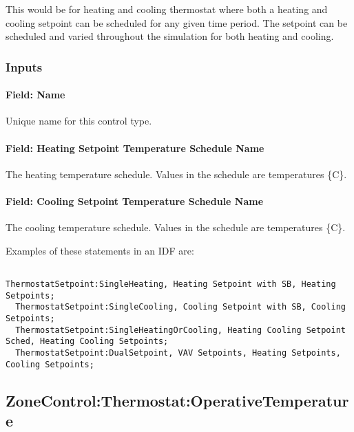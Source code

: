 This would be for heating and cooling thermostat where both a heating and cooling setpoint can be scheduled for any given time period. The setpoint can be scheduled and varied throughout the simulation for both heating and cooling.

\subsubsection{Inputs}\label{inputs-4-039}

\paragraph{Field: Name}\label{field-name-4-034}

Unique name for this control type.

\paragraph{Field: Heating Setpoint Temperature Schedule Name}\label{field-heating-setpoint-temperature-schedule-name-000}

The heating temperature schedule. Values in the schedule are temperatures \{C\}.

\paragraph{Field: Cooling Setpoint Temperature Schedule Name}\label{field-cooling-setpoint-temperature-schedule-name}

The cooling temperature schedule. Values in the schedule are temperatures \{C\}.

Examples of these statements in an IDF are:

\begin{lstlisting}

ThermostatSetpoint:SingleHeating, Heating Setpoint with SB, Heating Setpoints;
  ThermostatSetpoint:SingleCooling, Cooling Setpoint with SB, Cooling Setpoints;
  ThermostatSetpoint:SingleHeatingOrCooling, Heating Cooling Setpoint Sched, Heating Cooling Setpoints;
  ThermostatSetpoint:DualSetpoint, VAV Setpoints, Heating Setpoints, Cooling Setpoints;
\end{lstlisting}

\subsection{ZoneControl:Thermostat:OperativeTemperature}\label{zonecontrolthermostatoperativetemperature}

